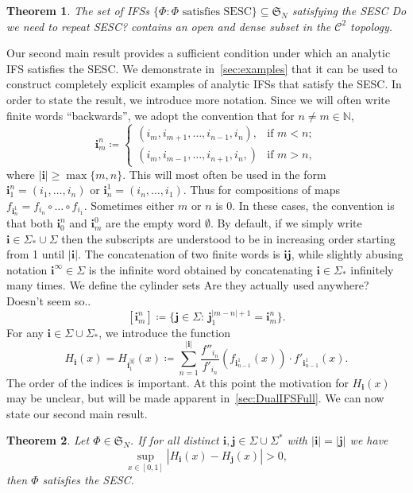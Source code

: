 \documentclass[12pt,]{article}
\def\cref#1{\ref{#1}}%
\newtheorem{theorem}{Theorem}[section]
\theoremstyle{definition}
\theoremstyle{remark}
\newcommand{\0}{\mathbf{0}}
\newcommand{\bi}{\mathbf{i}}
\newcommand{\bj}{\mathbf{j}}
\begin{document}
\begin{theorem}\label{thm:ESCOpenDense}
  The set of IFSs $\{\Phi \colon \Phi\text{ satisfies SESC}\}\subseteq \mathfrak{S}_N$ satisfying the
  SESC {\color{red} Do we need to repeat SESC?} contains an open and
  dense subset in the $\mathcal{C}^2$ topology.
\end{theorem}
Our second main result provides a sufficient condition under which an analytic IFS satisfies the
SESC. We demonstrate in~\cref{sec:examples} that it can be used to construct completely explicit
examples of analytic IFSs that satisfy the SESC. In order to state the result, we introduce more
notation. Since we will often write finite words ``backwards'', we adopt the convention that for
$n\neq m\in\mathbb{N}$,
\begin{equation*}
	\bi_m^n\coloneqq
	\begin{cases}
		(i_m,i_{m+1},\ldots,i_{n-1},i_n), &\text{if } m<n; \\
		(i_m,i_{m-1},\ldots,i_{n+1},i_n,) &\text{if } m>n,
	\end{cases}
\end{equation*}
where $|\bi|\geq\max\{m,n\}$. This will most often be used in the form $\bi_1^n=(i_1,\ldots,i_n)$ or
$\bi_n^1=(i_n,\ldots,i_1)$. Thus for compositions of maps $f_{\bi_n^1}=f_{i_n}\circ \dots \circ
f_{i_1}$. Sometimes either $m$ or $n$ is $0$. In these cases, the convention is that both $\bi_0^n$
and $\bi_m^0$ are the empty word $\emptyset$. By default, if we simply write
$\bi\in\Sigma_*\cup\Sigma$ then the subscripts are understood to be in increasing order starting
from 1 until $|\bi|$. The concatenation of two finite words is $\bi\bj$, while slightly abusing
notation $\bi^{\infty}\in \Sigma$ is the infinite word obtained by concatenating $\bi\in\Sigma_*$
infinitely many times. We define the cylinder sets {\color{red} Are they actually used anywhere? Doesn't seem so..}
$$[\bi_m^n] \coloneqq \big\{\bj\in\Sigma :\, \bj_1^{|m-n|+1} = \bi_m^n\big\}.$$  
For any $\bi\in \Sigma\cup\Sigma_*$, we introduce the function 
\begin{equation}\label{eq:H_i(x)}
H_{\bi}(x)=H_{\bi_{1}^{|\bi|}}(x) \coloneqq \sum_{n=1}^{|\bi|}
\frac{f''_{i_n}}{f'_{i_n}}(f_{\bi_{n-1}^1}(x))\cdot f'_{\bi_{n-1}^1}(x).
\end{equation}
The order of the indices is important. At this point the motivation for $H_{\bi}(x)$ may be unclear,
but will be made apparent in~\cref{sec:DualIFSFull}. 
We can now state our second main result.
\begin{theorem}
  \label{thm:main}
  Let $\Phi\in\mathfrak{S}_N$. If for all distinct $\bi,\bj \in\Sigma\cup\Sigma^*$ with $|\bi|=|\bj|$ we have
\begin{equation}\label{eq:H_iSSC}
    \sup_{x\in[0,1]} |H_{\bi}(x) - H_{\bj}(x)| > 0,
\end{equation}
then $\Phi$ satisfies the SESC.
\end{theorem}
\end{document}
